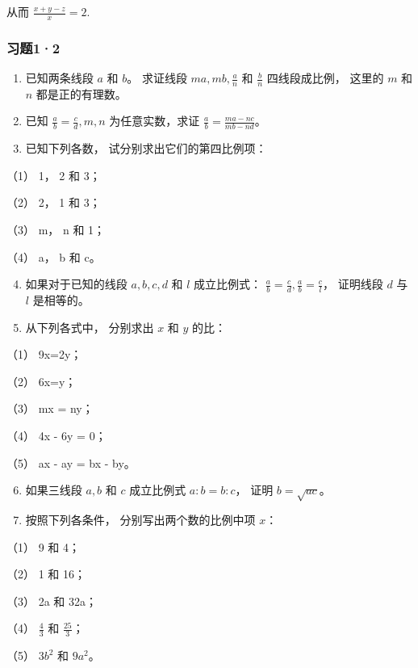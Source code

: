 从而 \(\frac{x + y - z}{x} = 2.\)

\subsubsection{习题1·2}

\begin{enumerate}
\item
  已知两条线段 \(a\) 和 \(b\)。 求证线段 \(ma, mb, \frac{a}{n}\) 和
  \(\frac{b}{n}\) 四线段成比例， 这里的 \(m\) 和 \(n\) 都是正的有理数。
\item
  已知 \(\frac{a}{b} = \frac{c}{d}, m, n\) 为任意实数，求证
  \(\frac{a}{b} = \frac{ma - nc}{mb - nd}\)。
\item
  已知下列各数， 试分别求出它们的第四比例项：
\end{enumerate}

（1） 1， 2 和 3；

（2） 2， 1 和 3；

（3） m， n 和 1；

（4） a， b 和 c。

\begin{enumerate}
\setcounter{enumi}{3}
\item
  如果对于已知的线段 \(a, b, c, d\) 和 \(l\) 成立比例式：
  \(\frac{a}{b} = \frac{c}{d}, \frac{a}{b} = \frac{c}{l}\)， 证明线段
  \(d\) 与 \(l\) 是相等的。
\item
  从下列各式中， 分别求出 \(x\) 和 \(y\) 的比：
\end{enumerate}

（1） 9x=2y；

（2） 6x=y；

（3） mx = ny；

（4） 4x - 6y = 0；

（5） ax - ay = bx - by。

\begin{enumerate}
\setcounter{enumi}{5}
\item
  如果三线段 \(a, b\) 和 \(c\) 成立比例式 \(a:b = b:c\)， 证明
  \(b = \sqrt{ac}\)。
\item
  按照下列各条件， 分别写出两个数的比例中项 \(x\)：
\end{enumerate}

（1） 9 和 4；

（2） 1 和 16；

（3） 2a 和 32a；

（4） \(\frac{4}{3}\) 和 \(\frac{25}{3}\)；

（5） \(3b^{2}\) 和 \(9a^{2}\)。

